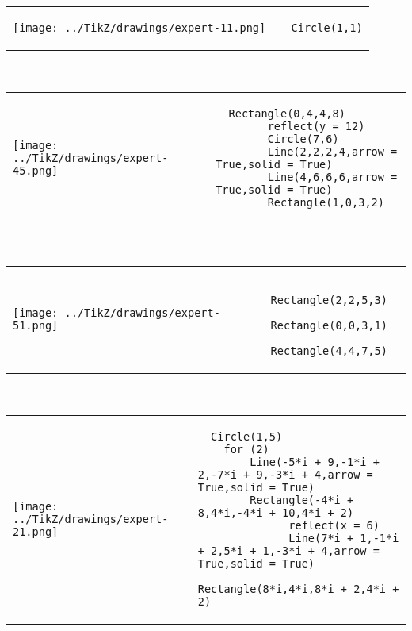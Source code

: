         \begin{tabular}{ll}
\texttt{[image: ../TikZ/drawings/expert-11.png]}&
        \begin{minipage}{10cm}
        \begin{verbatim}
  Circle(1,1)
        \end{verbatim}
\end{minipage}
\end{tabular}        
        \\

        \begin{tabular}{ll}
\texttt{[image: ../TikZ/drawings/expert-45.png]}&
        \begin{minipage}{10cm}
        \begin{verbatim}
  Rectangle(0,4,4,8)
        reflect(y = 12)
        Circle(7,6)
        Line(2,2,2,4,arrow = True,solid = True)
        Line(4,6,6,6,arrow = True,solid = True)
        Rectangle(1,0,3,2)
        \end{verbatim}
\end{minipage}
\end{tabular}        
        \\

        \begin{tabular}{ll}
\texttt{[image: ../TikZ/drawings/expert-51.png]}&
        \begin{minipage}{10cm}
        \begin{verbatim}
  Rectangle(2,2,5,3)
  Rectangle(0,0,3,1)
  Rectangle(4,4,7,5)
        \end{verbatim}
\end{minipage}
\end{tabular}        
        \\

        \begin{tabular}{ll}
\texttt{[image: ../TikZ/drawings/expert-21.png]}&
        \begin{minipage}{10cm}
        \begin{verbatim}
  Circle(1,5)
    for (2)
        Line(-5*i + 9,-1*i + 2,-7*i + 9,-3*i + 4,arrow = True,solid = True)
        Rectangle(-4*i + 8,4*i,-4*i + 10,4*i + 2)
              reflect(x = 6)
              Line(7*i + 1,-1*i + 2,5*i + 1,-3*i + 4,arrow = True,solid = True)
              Rectangle(8*i,4*i,8*i + 2,4*i + 2)
        \end{verbatim}
\end{minipage}
\end{tabular}        
        \\

